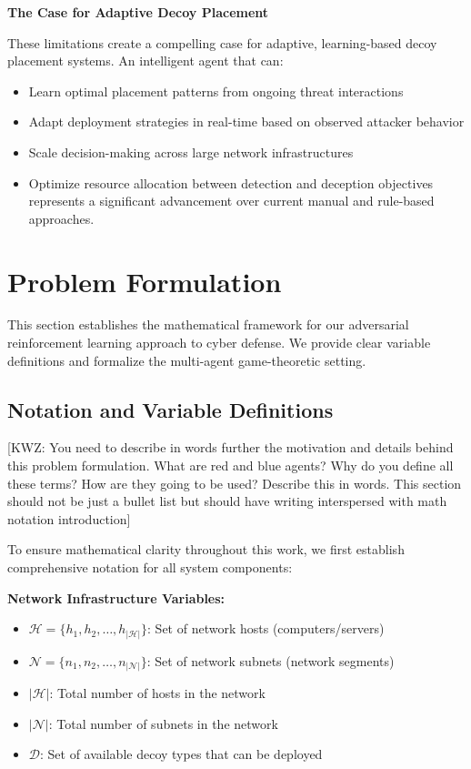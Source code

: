 \documentclass[12pt,oneside]{article}
\newcommand{\kwz}[1]{
  {\color{magenta} [KWZ: {#1}]}
 }
\begin{document}
\textbf{The Case for Adaptive Decoy Placement}

These limitations create a compelling case for adaptive, learning-based decoy placement systems. An intelligent agent that can:
\begin{itemize}
    \item Learn optimal placement patterns from ongoing threat interactions
    \item Adapt deployment strategies in real-time based on observed attacker behavior
    \item Scale decision-making across large network infrastructures
    \item Optimize resource allocation between detection and deception objectives represents a significant advancement over current manual and rule-based approaches.
\end{itemize}



\section{Problem Formulation}

This section establishes the mathematical framework for our adversarial reinforcement learning approach to cyber defense. We provide clear variable definitions and formalize the multi-agent game-theoretic setting.

\subsection{Notation and Variable Definitions}

\kwz{You need to describe in words further the motivation and details behind this problem formulation. What are red and blue agents? Why do you define all these terms? How are they going to be used? Describe this in words. This section should not be just a bullet list but should have writing interspersed with math notation introduction}

To ensure mathematical clarity throughout this work, we first establish comprehensive notation for all system components:

\textbf{Network Infrastructure Variables:}
\begin{itemize}
    \item $\mathcal{H} = \{h_1, h_2, \ldots, h_{|\mathcal{H}|}\}$: Set of network hosts (computers/servers)
    \item $\mathcal{N} = \{n_1, n_2, \ldots, n_{|\mathcal{N}|}\}$: Set of network subnets (network segments)
    \item $|\mathcal{H}|$: Total number of hosts in the network
    \item $|\mathcal{N}|$: Total number of subnets in the network
    \item $\mathcal{D}$: Set of available decoy types that can be deployed
\end{itemize}
\end{document}
